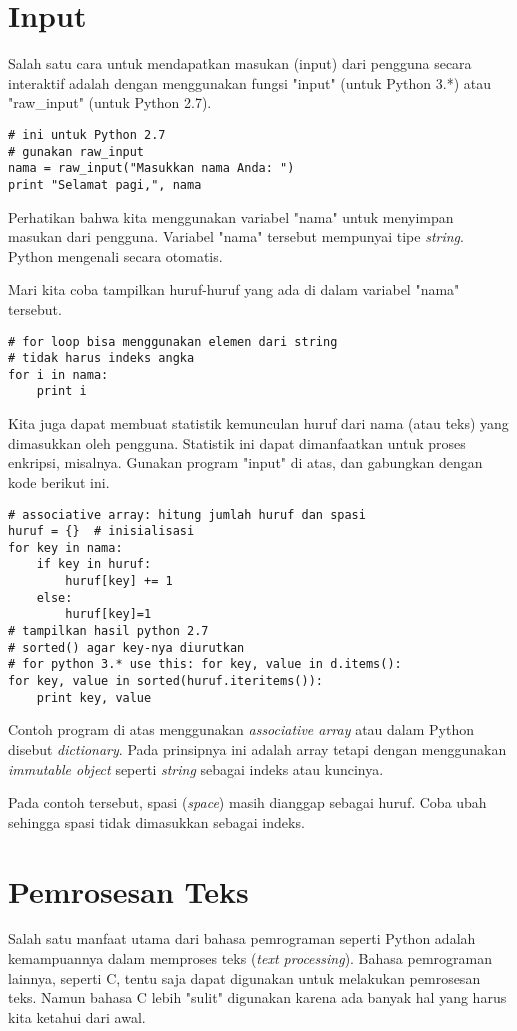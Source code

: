 \section{Input}
Salah satu cara untuk mendapatkan masukan (input) dari pengguna secara
interaktif adalah dengan menggunakan fungsi "input" (untuk Python 3.*)
atau "raw\_input" (untuk Python 2.7).

\begin{verbatim}
# ini untuk Python 2.7
# gunakan raw_input
nama = raw_input("Masukkan nama Anda: ")
print "Selamat pagi,", nama
\end{verbatim}

Perhatikan bahwa kita menggunakan variabel "nama" untuk menyimpan masukan
dari pengguna. Variabel "nama" tersebut mempunyai tipe {\em string}.
Python mengenali secara otomatis.

Mari kita coba tampilkan huruf-huruf yang ada di dalam variabel "nama"
tersebut.

\begin{verbatim}
# for loop bisa menggunakan elemen dari string
# tidak harus indeks angka
for i in nama:
    print i
\end{verbatim}

Kita juga dapat membuat statistik kemunculan huruf dari nama (atau teks)
yang dimasukkan oleh pengguna. Statistik ini dapat dimanfaatkan untuk
proses enkripsi, misalnya. Gunakan program "input" di atas, dan gabungkan
dengan kode berikut ini.

\begin{verbatim}
# associative array: hitung jumlah huruf dan spasi
huruf = {}  # inisialisasi
for key in nama:
    if key in huruf:
        huruf[key] += 1
    else:
        huruf[key]=1
# tampilkan hasil python 2.7
# sorted() agar key-nya diurutkan
# for python 3.* use this: for key, value in d.items():
for key, value in sorted(huruf.iteritems()):
    print key, value
\end{verbatim}

Contoh program di atas menggunakan {\em associative array} atau dalam
Python disebut {\em dictionary}. Pada prinsipnya ini adalah array tetapi
dengan menggunakan {\em immutable object} seperti {\em string} sebagai
indeks atau kuncinya.

Pada contoh tersebut, spasi ({\em space}) masih dianggap sebagai huruf.
Coba ubah sehingga spasi tidak dimasukkan sebagai indeks.


\section{Pemrosesan Teks}
Salah satu manfaat utama dari bahasa pemrograman seperti Python adalah
kemampuannya dalam memproses teks ({\em text processing}). Bahasa
pemrograman lainnya, seperti C, tentu saja dapat digunakan untuk melakukan
pemrosesan teks. Namun bahasa C lebih "sulit" digunakan karena ada banyak
hal yang harus kita ketahui dari awal.

